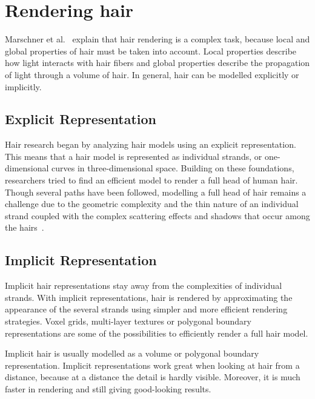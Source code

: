 \documentclass[11pt,a4paper]{report}
\begin{document}
\section{Rendering hair}

Marschner et al.~\cite{marschner} explain that hair rendering is a complex task, because local and global properties of hair must be taken into account. Local properties describe how light interacts with hair fibers and global properties describe the propagation of light through a volume of hair. In general, hair can be modelled explicitly or implicitly.

\subsection{Explicit Representation}

Hair research began by analyzing hair models using an explicit representation. This means that a hair model is represented as individual strands, or one-dimensional curves in three-dimensional space. Building on these foundations, researchers tried to find an efficient model to render a full head of human hair. Though several paths have been followed, modelling a full head of hair remains a challenge due to the geometric complexity and the thin nature of an individual strand coupled with the complex scattering effects and shadows that occur among the hairs~\cite{ward}.

\subsection{Implicit Representation}

Implicit hair representations stay away from the complexities of individual strands. With implicit representations, hair is rendered by approximating the appearance of the several strands using simpler and more efficient rendering strategies. Voxel grids, multi-layer textures or polygonal boundary representations are some of the possibilities to efficiently render a full hair model.

Implicit hair is usually modelled as a volume or polygonal boundary representation. Implicit representations work great when looking at hair from a distance, because at a distance the detail is hardly visible. Moreover, it is much faster in rendering and still giving good-looking results.

\end{document}
